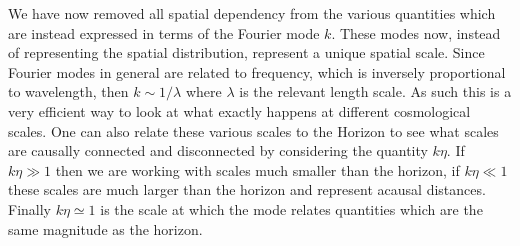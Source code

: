 \documentclass[%
reprint,
 amsmath,amssymb,
 aps,
]{revtex4-2}
\begin{document}
We have now removed all spatial dependency from the various quantities which are instead expressed in terms of the Fourier mode $k$. These modes now, instead of representing the spatial distribution, represent a unique spatial scale. Since Fourier modes in general are related to frequency, which is inversely proportional to wavelength, then $k\sim 1/\lambda$ where $\lambda$ is the relevant length scale. As such this is a very efficient way to look at what exactly happens at different cosmological scales. One can also relate these various scales to the Horizon to see what scales are causally connected and disconnected by considering the quantity $k\eta$. If $k\eta\gg1$ then we are working with scales much smaller than the horizon, if $k\eta\ll1$ these scales are much larger than the horizon and represent acausal distances. Finally $k\eta\simeq1$ is the scale at which the mode relates quantities which are the same magnitude as the horizon.
\end{document}
